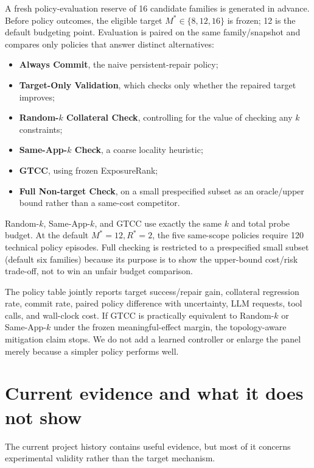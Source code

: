\documentclass{article}
\begin{document}
A fresh policy-evaluation reserve of 16 candidate families is generated in advance. Before policy outcomes, the eligible target $M^*\in\{8,12,16\}$ is frozen; 12 is the default budgeting point. Evaluation is paired on the same family/snapshot and compares only policies that answer distinct alternatives:
\begin{itemize}
 \item \textbf{Always Commit}, the naive persistent-repair policy;
 \item \textbf{Target-Only Validation}, which checks only whether the repaired target improves;
 \item \textbf{Random-$k$ Collateral Check}, controlling for the value of checking any $k$ constraints;
 \item \textbf{Same-App-$k$ Check}, a coarse locality heuristic;
 \item \textbf{GTCC}, using frozen ExposureRank;
 \item \textbf{Full Non-target Check}, on a small prespecified subset as an oracle/upper bound rather than a same-cost competitor.
\end{itemize}
Random-$k$, Same-App-$k$, and GTCC use exactly the same $k$ and total probe budget. At the default $M^*=12,R^*=2$, the five same-scope policies require 120 technical policy episodes. Full checking is restricted to a prespecified small subset (default six families) because its purpose is to show the upper-bound cost/risk trade-off, not to win an unfair budget comparison.

The policy table jointly reports target success/repair gain, collateral regression rate, commit rate, paired policy difference with uncertainty, LLM requests, tool calls, and wall-clock cost. If GTCC is practically equivalent to Random-$k$ or Same-App-$k$ under the frozen meaningful-effect margin, the topology-aware mitigation claim stops. We do not add a learned controller or enlarge the panel merely because a simpler policy performs well.

\section{Current evidence and what it does not show}
\label{sec:current}
The current project history contains useful evidence, but most of it concerns experimental validity rather than the target mechanism.
\end{document}
